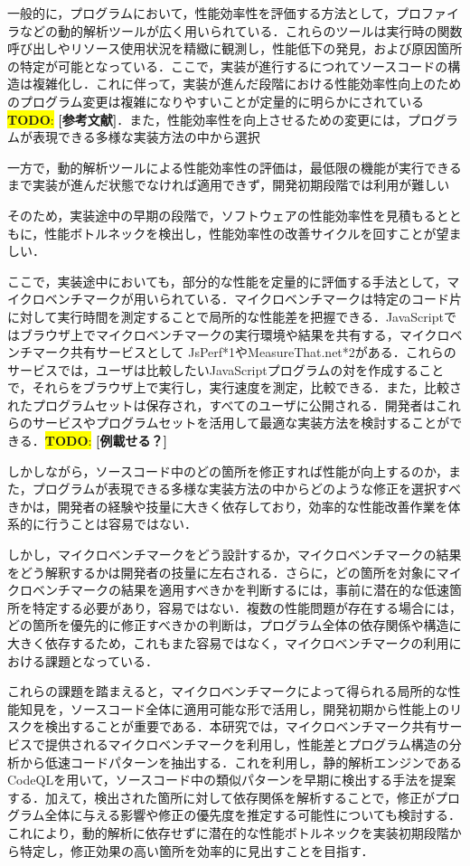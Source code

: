 \documentclass[submit,techrep,noauthor]{ipsj}
\newcommand{\todo}[1]{\colorbox{yellow}{{\bf TODO}:}{\color{red} {\textbf{[#1]}}}}
\begin{document}
一般的に，プログラムにおいて，性能効率性を評価する方法として，プロファイラなどの動的解析ツールが広く用いられている．これらのツールは実行時の関数呼び出しやリソース使用状況を精緻に観測し，性能低下の発見，および原因箇所の特定が可能となっている．ここで，実装が進行するにつれてソースコードの構造は複雑化し．これに伴って，実装が進んだ段階における性能効率性向上のためのプログラム変更は複雑になりやすいことが定量的に明らかにされている\todo{参考文献}．また，性能効率性を向上させるための変更には，プログラムが表現できる多様な実装方法の中から選択

一方で，動的解析ツールによる性能効率性の評価は，最低限の機能が実行できるまで実装が進んだ状態でなければ適用できず，開発初期段階では利用が難しい

そのため，実装途中の早期の段階で，ソフトウェアの性能効率性を見積もるとともに，性能ボトルネックを検出し，性能効率性の改善サイクルを回すことが望ましい．

ここで，実装途中においても，部分的な性能を定量的に評価する手法として，マイクロベンチマークが用いられている．マイクロベンチマークは特定のコード片に対して実行時間を測定することで局所的な性能差を把握できる．JavaScriptではブラウザ上でマイクロベンチマークの実行環境や結果を共有する，マイクロベンチマーク共有サービスとして JsPerf*1やMeasureThat.net*2がある．これらのサービスでは，ユーザは比較したいJavaScriptプログラムの対を作成することで，それらをブラウザ上で実行し，実行速度を測定，比較できる．また，比較されたプログラムセットは保存され，すべてのユーザに公開される．開発者はこれらのサービスやプログラムセットを活用して最適な実装方法を検討することができる．\todo{例載せる？}

しかしながら，ソースコード中のどの箇所を修正すれば性能が向上するのか，また，プログラムが表現できる多様な実装方法の中からどのような修正を選択すべきかは，開発者の経験や技量に大きく依存しており，効率的な性能改善作業を体系的に行うことは容易ではない．

しかし，マイクロベンチマークをどう設計するか，マイクロベンチマークの結果をどう解釈するかは開発者の技量に左右される．さらに，どの箇所を対象にマイクロベンチマークの結果を適用すべきかを判断するには，事前に潜在的な低速箇所を特定する必要があり，容易ではない．複数の性能問題が存在する場合には，どの箇所を優先的に修正すべきかの判断は，プログラム全体の依存関係や構造に大きく依存するため，これもまた容易ではなく，マイクロベンチマークの利用における課題となっている．

これらの課題を踏まえると，マイクロベンチマークによって得られる局所的な性能知見を，ソースコード全体に適用可能な形で活用し，開発初期から性能上のリスクを検出することが重要である．本研究では，マイクロベンチマーク共有サービスで提供されるマイクロベンチマークを利用し，性能差とプログラム構造の分析から低速コードパターンを抽出する．これを利用し，静的解析エンジンであるCodeQLを用いて，ソースコード中の類似パターンを早期に検出する手法を提案する．加えて，検出された箇所に対して依存関係を解析することで，修正がプログラム全体に与える影響や修正の優先度を推定する可能性についても検討する．これにより，動的解析に依存せずに潜在的な性能ボトルネックを実装初期段階から特定し，修正効果の高い箇所を効率的に見出すことを目指す．
\end{document}
